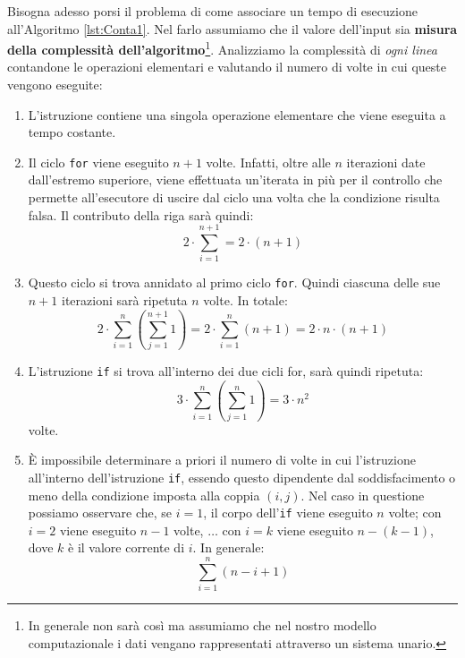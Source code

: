 Bisogna adesso porsi il problema di come associare un tempo di esecuzione all'Algoritmo \ref{lst:Conta1}. Nel farlo assumiamo che il valore dell'input sia \textbf{misura della complessità dell'algoritmo}\footnote{In generale non sarà così ma assumiamo che nel nostro modello computazionale i dati vengano rappresentati attraverso un sistema unario.}. Analizziamo la complessità di \textit{ogni linea} contandone le operazioni elementari e valutando il numero di volte in cui queste vengono eseguite:
\begin{enumerate}
  \item L'istruzione contiene una singola operazione elementare che viene eseguita a tempo costante.
  \item Il ciclo \texttt{for} viene eseguito $n+1$ volte. Infatti, oltre alle $n$ iterazioni date dall'estremo superiore, viene effettuata un'iterata in più per il controllo che permette all'esecutore di uscire dal ciclo una volta che la condizione risulta falsa. Il contributo della riga sarà quindi:
	\begin{displaymath}
		2 \cdot \sum_{i=1}^{n+1}=2 \cdot (n+1)
	\end{displaymath}
  \item Questo ciclo si trova annidato al primo ciclo \texttt{for}. Quindi ciascuna delle sue $n+1$ iterazioni sarà ripetuta $n$ volte. In totale:
	\begin{displaymath}
		2 \cdot \sum_{i=1}^{n} (\sum_{j=1}^{n+1} 1 )= 2 \cdot \sum_{i=1}^{n}(n+1)=2 \cdot n \cdot (n+1)
	\end{displaymath}
  \item L'istruzione \texttt{if} si trova all'interno dei due cicli for, sarà quindi ripetuta:
	\begin{displaymath}
		3 \cdot \sum_{i=1}^{n}(\sum_{j=1}^{n} 1) = 3 \cdot n^{2}
	\end{displaymath}
	volte.
  \item È impossibile determinare a priori il numero di volte in cui l'istruzione all'interno dell'istruzione \texttt{if}, essendo questo dipendente dal soddisfacimento o meno della condizione imposta alla coppia $(i,j)$. Nel caso in questione possiamo osservare che, se $i=1$, il corpo dell'\texttt{if} viene eseguito $n$ volte; con $i=2$ viene eseguito $n-1$ volte, $\ldots$ con $i=k$ viene eseguito $n-(k-1)$, dove $k$ è il valore corrente di $i$. In generale:
  \begin{displaymath}
  \sum_{i=1}^{n} (n-i+1)
  \end{displaymath}
\end{enumerate}

